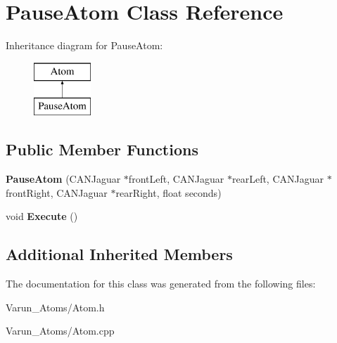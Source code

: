 \hypertarget{class_pause_atom}{\section{Pause\-Atom Class Reference}
\label{class_pause_atom}
}
Inheritance diagram for Pause\-Atom\-:\begin{figure}[H]
\begin{center}
\leavevmode
\includegraphics[height=2.000000cm]{class_pause_atom}
\end{center}
\end{figure}
\subsection*{Public Member Functions}
\begin{DoxyCompactItemize}
\item 
\hypertarget{class_pause_atom_a5d14b1d8911be8cf0155404b9b0358e5}{{\bfseries Pause\-Atom} (C\-A\-N\-Jaguar $\ast$front\-Left, C\-A\-N\-Jaguar $\ast$rear\-Left, C\-A\-N\-Jaguar $\ast$front\-Right, C\-A\-N\-Jaguar $\ast$rear\-Right, float seconds)}\label{class_pause_atom_a5d14b1d8911be8cf0155404b9b0358e5}

\item 
\hypertarget{class_pause_atom_aa2bf24fcd9b6c209101d256ad6735749}{void {\bfseries Execute} ()}\label{class_pause_atom_aa2bf24fcd9b6c209101d256ad6735749}

\end{DoxyCompactItemize}
\subsection*{Additional Inherited Members}


The documentation for this class was generated from the following files\-:\begin{DoxyCompactItemize}
\item 
Varun\-\_\-\-Atoms/Atom.\-h\item 
Varun\-\_\-\-Atoms/Atom.\-cpp\end{DoxyCompactItemize}
